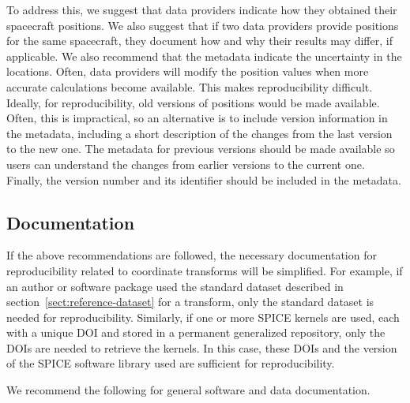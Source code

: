 \documentclass[draft]{agujournal2019}
\begin{document}

To address this, we suggest that data providers indicate how they obtained their spacecraft positions. We also suggest that if two data providers provide positions for the same spacecraft, they document how and why their results may differ, if applicable. We also recommend that the metadata indicate the uncertainty in the locations. Often, data providers will modify the position values when more accurate calculations become available. This makes reproducibility difficult. Ideally, for reproducibility, old versions of positions would be made available. Often, this is impractical, so an alternative is to include version information in the metadata, including a short description of the changes from the last version to the new one. The metadata for previous versions should be made available so users can understand the changes from earlier versions to the current one. Finally, the version number and its identifier should be included in the metadata.

\subsection{Documentation}

If the above recommendations are followed, the necessary documentation for reproducibility related to coordinate transforms will be simplified. For example, if an author or software package used the standard dataset described in section~\ref{sect:reference-dataset} for a transform, only the standard dataset is needed for reproducibility. Similarly, if one or more SPICE kernels are used, each with a unique DOI and stored in a permanent generalized repository, only the DOIs are needed to retrieve the kernels. In this case, these DOIs and the version of the SPICE software library used are sufficient for reproducibility.

We recommend the following for general software and data documentation.
\end{document}
